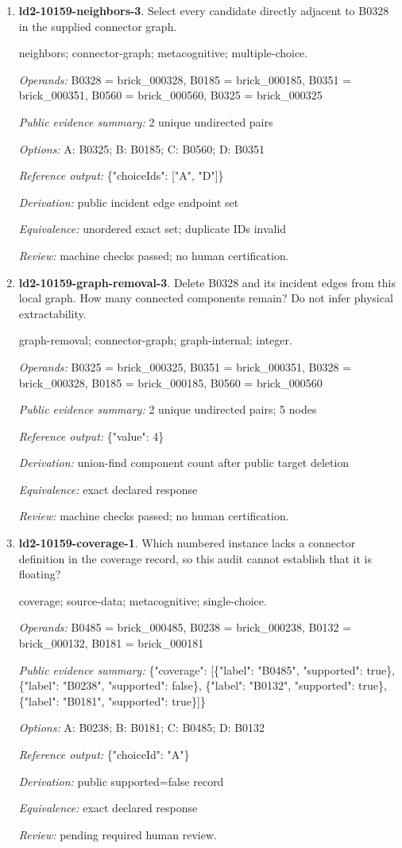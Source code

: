 \begin{enumerate}
\item \textbf{ld2-10159-neighbors-3}. Select every candidate directly adjacent to B0328 in the supplied connector graph.
\par{\small neighbors; connector-graph; metacognitive; multiple-choice.\par\textit{Operands:} B0328 = brick\_000328, B0185 = brick\_000185, B0351 = brick\_000351, B0560 = brick\_000560, B0325 = brick\_000325\par\textit{Public evidence summary:} 2 unique undirected pairs\par\textit{Options:} A: B0325; B: B0185; C: B0560; D: B0351\par\textit{Reference output:} \{"choiceIds": ["A", "D"]\}\par\textit{Derivation:} public incident edge endpoint set\par\textit{Equivalence:} unordered exact set; duplicate IDs invalid\par\textit{Review:} machine checks passed; no human certification.}
\item \textbf{ld2-10159-graph-removal-3}. Delete B0328 and its incident edges from this local graph. How many connected components remain? Do not infer physical extractability.
\par{\small graph-removal; connector-graph; graph-internal; integer.\par\textit{Operands:} B0325 = brick\_000325, B0351 = brick\_000351, B0328 = brick\_000328, B0185 = brick\_000185, B0560 = brick\_000560\par\textit{Public evidence summary:} 2 unique undirected pairs; 5 nodes\par\textit{Reference output:} \{"value": 4\}\par\textit{Derivation:} union-find component count after public target deletion\par\textit{Equivalence:} exact declared response\par\textit{Review:} machine checks passed; no human certification.}
\item \textbf{ld2-10159-coverage-1}. Which numbered instance lacks a connector definition in the coverage record, so this audit cannot establish that it is floating?
\par{\small coverage; source-data; metacognitive; single-choice.\par\textit{Operands:} B0485 = brick\_000485, B0238 = brick\_000238, B0132 = brick\_000132, B0181 = brick\_000181\par\textit{Public evidence summary:} \{"coverage": [\{"label": "B0485", "supported": true\}, \{"label": "B0238", "supported": false\}, \{"label": "B0132", "supported": true\}, \{"label": "B0181", "supported": true\}]\}\par\textit{Options:} A: B0238; B: B0181; C: B0485; D: B0132\par\textit{Reference output:} \{"choiceId": "A"\}\par\textit{Derivation:} public supported=false record\par\textit{Equivalence:} exact declared response\par\textit{Review:} pending required human review.}

\end{enumerate}

